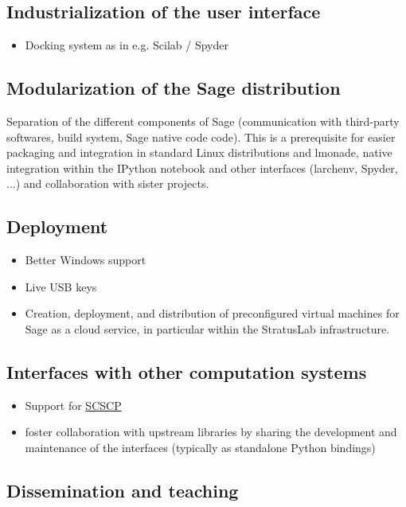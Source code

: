 \subsection{Industrialization of the user interface}

\begin{itemize}
\item Docking system as in e.g. Scilab / Spyder
\end{itemize}


\subsection{Modularization of the Sage distribution}
Separation of the different components of Sage (communication with third-party softwares, build system, Sage native code code). This is a prerequisite for easier packaging and integration in standard Linux distributions and lmonade, native integration within the IPython notebook and other interfaces (larchenv, Spyder, ...) and collaboration with sister projects.

\subsection{Deployment}
\begin{itemize}
\item Better Windows support
\item Live USB keys
\item Creation, deployment, and distribution of preconfigured virtual
machines for Sage as a cloud service, in particular within the
StratusLab infrastructure.
\end{itemize}

\subsection{Interfaces with other computation systems}

\begin{itemize}
\item Support for \href{http://www.symbolic-computing.org/}{SCSCP}
\item foster collaboration with upstream libraries by sharing the
  development and maintenance of the interfaces (typically as
  standalone Python bindings)
\end{itemize}


\subsection{Dissemination and teaching}

